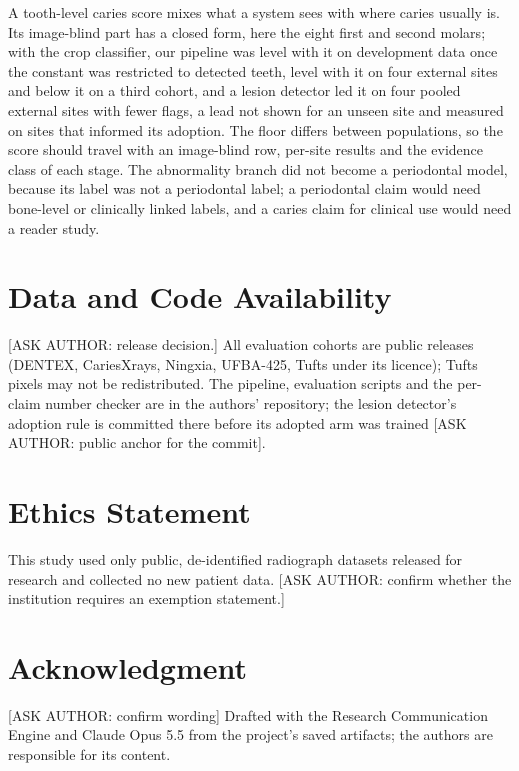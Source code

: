 \documentclass[conference]{IEEEtran}
\begin{document}
A tooth-level caries score mixes what a system sees with where caries usually is. Its image-blind part has a closed form, here the eight first and second molars; with the crop classifier, our pipeline was level with it on development data once the constant was restricted to detected teeth, level with it on four external sites and below it on a third cohort, and a lesion detector led it on four pooled external sites with fewer flags, a lead not shown for an unseen site and measured on sites that informed its adoption. The floor differs between populations, so the score should travel with an image-blind row, per-site results and the evidence class of each stage. The abnormality branch did not become a periodontal model, because its label was not a periodontal label; a periodontal claim would need bone-level or clinically linked labels, and a caries claim for clinical use would need a reader study.

\section*{Data and Code Availability}

[ASK AUTHOR: release decision.] All evaluation cohorts are public releases (DENTEX, CariesXrays, Ningxia, UFBA-425, Tufts under its licence); Tufts pixels may not be redistributed. The pipeline, evaluation scripts and the per-claim number checker are in the authors' repository; the lesion detector's adoption rule is committed there before its adopted arm was trained [ASK AUTHOR: public anchor for the commit].

\section*{Ethics Statement}

This study used only public, de-identified radiograph datasets released for research and collected no new patient data. [ASK AUTHOR: confirm whether the institution requires an exemption statement.]

\section*{Acknowledgment}

[ASK AUTHOR: confirm wording] Drafted with the Research Communication Engine and Claude Opus 5.5 from the project's saved artifacts; the authors are responsible for its content.



\end{document}
